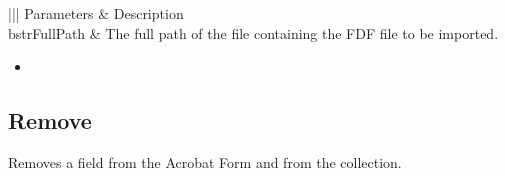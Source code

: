 \documentclass[letterpaper,12pt,english,openany,oneside]{sphinxmanual}
\begin{document}
\begin{savenotes}\sphinxattablestart
\centering
{}\label{\detokenize{IAC_API_FormsIntro:section-17}}\nobreak
\begin{tabular}[t]{|||}
\hline
\sphinxstyletheadfamily 
Parameters
&\sphinxstyletheadfamily 
Description
\\
\hline
bstrFullPath
&
The full path of the file containing the FDF file to be imported.
\\
\hline
\end{tabular}
\par
\sphinxattableend\end{savenotes}
\label{\detokenize{IAC_API_FormsIntro:related-methods-12}}
\begin{itemize}
\item {} 

\end{itemize}




\subsection{Remove}
\label{\detokenize{IAC_API_FormsIntro:remove}}
Removes a field from the Acrobat Form and from the  collection.

\label{\detokenize{IAC_API_FormsIntro:syntax-39}}

\begin{sphinxVerbatim}[commandchars=\\\{\}]
   
\end{sphinxVerbatim}
\label{\detokenize{IAC_API_FormsIntro:parameters-16}}
\end{document}
